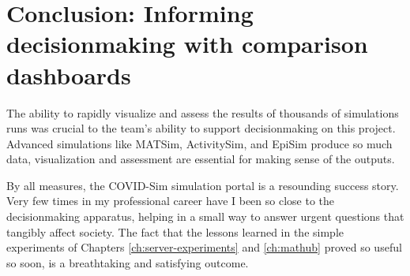 \hypertarget{covid-informing-decisionmaking-with-comparison-dashboards}{%
\section{Conclusion: Informing decisionmaking with comparison dashboards}\label{covid-informing-decisionmaking}}

The ability to rapidly visualize and assess the results of thousands of simulations runs was crucial to the team's ability to support decisionmaking on this project. Advanced simulations like MATSim, ActivitySim, and EpiSim produce so much data, visualization and assessment are essential for making sense of the outputs.

By all measures, the COVID-Sim simulation portal is a resounding success story. Very few times in my professional career have I been so close to the decisionmaking apparatus, helping in a small way to answer urgent questions that tangibly affect society. The fact that the lessons learned in the simple experiments of Chapters \ref{ch:server-experiments} and \ref{ch:mathub} proved so useful so soon, is a breathtaking and satisfying outcome.
